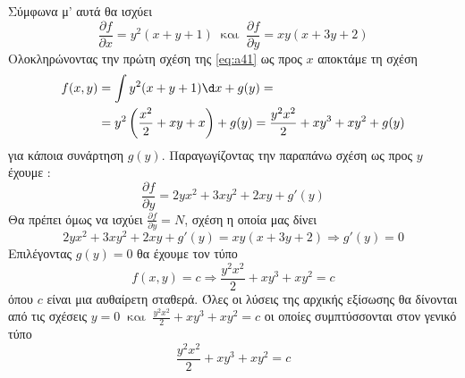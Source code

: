 \documentclass[a4paper,twoside,symmetric,11pt]{tufte-book}
\begin{document}
Σύμφωνα μ' αυτά θα ισχύει
\begin{equation}\label{eq:a41}
\frac{\partial f}{\partial x}=y^2(x+y+1)\ \textrm{ και }\ \frac{\partial f}{\partial y}=xy(x+3y+2)
\end{equation}
Ολοκληρώνοντας την πρώτη σχέση της \eqref{eq:a41} ως προς $ x $ αποκτάμε τη σχέση
\begin{align*} 
f(x,y)&=\int{y^2(x+y+1)\d x}+g(y)=\\&=y^2\left(\frac{x^2}{2}+xy+x \right)+g(y)=
\frac{y^2x^2}{2}+xy^3+xy^2+g(y) 
\end{align*}
για κάποια συνάρτηση $ g(y) $. Παραγωγίζοντας την παραπάνω σχέση ως προς $ y $ έχουμε :
\[ \frac{\partial f}{\partial y}=2yx^2+3xy^2+2xy+g'(y) \]
Θα πρέπει όμως να ισχύει $ \frac{\partial f}{\partial y}=N $, σχέση η οποία μας δίνει
\[ 2yx^2+3xy^2+2xy+g'(y)=xy(x+3y+2)\Rightarrow g'(y)=0 \]
Επιλέγοντας $ g(y)=0 $ θα έχουμε τον τύπο 
\[ f(x,y)=c\Rightarrow\frac{y^2x^2}{2}+xy^3+xy^2=c \]
όπου $ c $ είναι μια αυθαίρετη σταθερά. Όλες οι λύσεις της αρχικής εξίσωσης θα δίνονται από τις σχέσεις
$ y=0\ \textrm{ και }\ \frac{y^2x^2}{2}+xy^3+xy^2=c $ οι οποίες συμπτύσσονται στον γενικό τύπο
\[ \frac{y^2x^2}{2}+xy^3+xy^2=c \]
\end{document}
